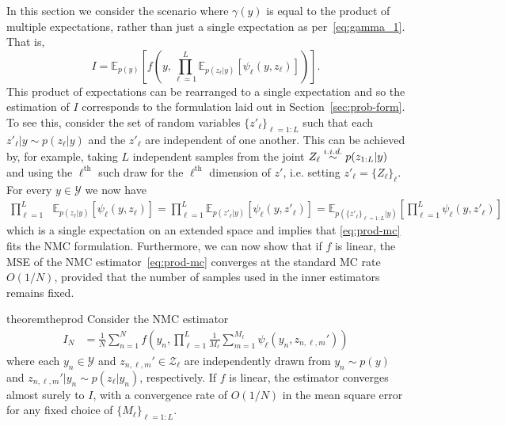In this section we consider the scenario  where $\gamma (y)$ is equal to the product of 
multiple expectations, rather than just a single expectation as per~\eqref{eq:gamma_1}.
That is,
\begin{equation}
\label{eq:prod-mc}
I = \mathbb{E}_{p(y)}\left[ f\left(y,\prod_{\ell=1}^{L}\mathbb{E}_{p(z_{\ell}|y)}\left[\psi_{\ell}(y,z_{\ell})\right]\right) \right].
\end{equation}
This product of expectations can be rearranged to a single expectation and so the estimation of $I$ 
corresponds to the formulation laid out in Section~\ref{sec:prob-form}. To see this, consider the set of 
random variables $\{z'_{\ell}\}_{\ell=1:L}$ such that each 
$z'_{\ell}|y \sim p(z_\ell | y)$ and the $z'_{\ell}$ are independent of one another. 
This can be achieved by, for example, taking $L$ independent samples from the joint $Z_{\ell} \overset{i.i.d.}{\sim} p(z_{1:L} | y)$ 
and using the $\ell^{\mathrm{th}}$ such draw for the $\ell^{\mathrm{th}}$ dimension of $z'$, i.e.
setting $z'_{\ell}= \{Z_{\ell}\}_{\ell}$.
For every $y \in \mathcal{Y}$ we now have
\begin{align*}
 \prod_{\ell=1}^{L}&\mathbb{E}_{p(z_{\ell}|y)}[\psi_{\ell}(y,z_{\ell})] =  \prod_{\ell=1}^{L}\mathbb{E}_{p(z'_{\ell}|y)}[\psi_{\ell}(y,z'_{\ell})]
  = \mathbb{E}_{p(\{z'_{\ell}\}_{\ell=1:L}|y)}\left[ \prod_{\ell=1}^{L} \psi_{\ell}(y,z'_{\ell}) \right]
\end{align*}
which is a single expectation on an extended space and implies that \eqref{eq:prod-mc} 
fits the NMC formulation.
Furthermore, we can now show that if $f$ is linear, the MSE of the NMC estimator~\eqref{eq:prod-mc}
converges at the standard MC rate $O(1/N)$, provided that 
the number of samples used in the inner estimators remains fixed.  

\begin{restatable}{theorem}{theprod}
	\label{the:prod}
	Consider the NMC estimator
	\begin{align*}
	I_{N} &= \frac{1}{N}\sum_{n=1}^N f\left(y_n,\prod_{\ell=1}^{L} \frac{1}{M_{\ell}} \sum_{m=1}^{M_{\ell}} \psi_{\ell}(y_n,z_{n,\ell,m}')\right)
	\end{align*}
	where each $y_n \in \mathcal{Y}$ and $z_{n,\ell,m}' \in \mathcal{Z}_{\ell}$ are independently drawn from 
	$y_n \sim p(y)$ and $z_{n,\ell,m}' | y_n \sim p(z_{\ell} | y_n)$, respectively. If $f$ is linear, 
        the estimator converges almost surely to $I$,
	with a convergence rate of $O(1/N)$ in the mean square error for any fixed choice of $\{M_{\ell}\}_{\ell = 1:L}$.
\end{restatable}

